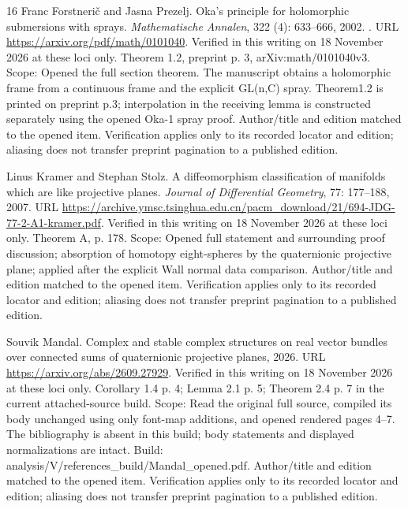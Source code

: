 \documentclass[11pt,a4paper]{article}
\theoremstyle{definition}
\begin{document}
\begin{thebibliography}{16}
Franc Forstneri{\v c} and Jasna Prezelj.
\newblock Oka's principle for holomorphic submersions with sprays.
\newblock \emph{Mathematische Annalen}, 322 (4): 633--666,
  2002.
\newblock {}.
\newblock URL \url{https://arxiv.org/pdf/math/0101040}.
\newblock Verified in this writing on 18 November 2026 at these loci only.
  Theorem 1.2, preprint p. 3, arXiv:math/0101040v3. Scope: Opened the full
  section theorem. The manuscript obtains a holomorphic frame from a continuous
  frame and the explicit GL(n,C) spray. Theorem1.2 is printed on preprint p.3;\allowbreak{}
  interpolation in the receiving lemma is constructed separately using the
  opened Oka-1 spray proof. Author/title and edition matched to the opened
  item. Verification applies only to its recorded locator and edition;\allowbreak{} aliasing
  does not transfer preprint pagination to a published edition.

Linus Kramer and Stephan Stolz.
\newblock A diffeomorphism classification of manifolds which are like
  projective planes.
\newblock \emph{Journal of Differential Geometry}, 77: 177--188, 2007.
\newblock URL
  \url{https://archive.ymsc.tsinghua.edu.cn/pacm_download/21/694-JDG-77-2-A1-kramer.pdf}.
\newblock Verified in this writing on 18 November 2026 at these loci only.
  Theorem A, p. 178. Scope: Opened full statement and surrounding proof
  discussion;\allowbreak{} absorption of homotopy eight-spheres by the quaternionic
  projective plane;\allowbreak{} applied after the explicit Wall normal data comparison.
  Author/title and edition matched to the opened item. Verification applies
  only to its recorded locator and edition;\allowbreak{} aliasing does not transfer preprint
  pagination to a published edition.

Souvik Mandal.
\newblock Complex and stable complex structures on real vector bundles over
  connected sums of quaternionic projective planes, 2026.
\newblock URL \url{https://arxiv.org/abs/2609.27929}.
\newblock Verified in this writing on 18 November 2026 at these loci only.
  Corollary 1.4 p. 4;\allowbreak{} Lemma 2.1 p. 5;\allowbreak{} Theorem 2.4 p. 7 in the current
  attached-source build. Scope: Read the original full source, compiled its
  body unchanged using only font-map additions, and opened rendered pages
  4–7. The bibliography is absent in this build;\allowbreak{} body statements and
  displayed normalizations are intact. Build:
  analysis/V/references\_build/Mandal\_opened.pdf. Author/title and edition
  matched to the opened item. Verification applies only to its recorded locator
  and edition;\allowbreak{} aliasing does not transfer preprint pagination to a published
  edition.


\end{thebibliography}
\end{document}
